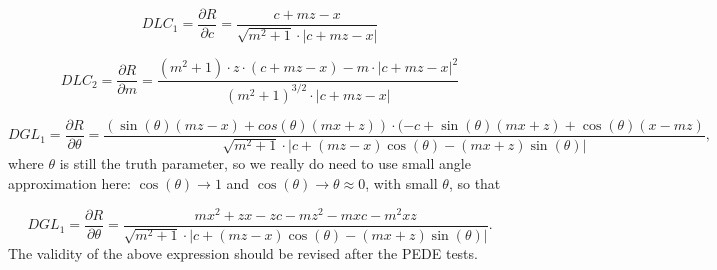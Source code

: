 \documentclass[a4paper,11pt]{article}
\begin{document}
\begin{equation}
DLC_1 = \frac{\partial R}{\partial c} = \frac{ c+mz-x }  { \sqrt{m^2+1} \cdot |c+mz-x| }
\end{equation}

\begin{equation}
DLC_2 = \frac{ \partial R}{\partial m} = \frac{ (m^2+1)\cdot z\cdot(c+mz-x) - m\cdot |c+mz-x|^2 }{ (m^2+1)^{3/2} \cdot |c+mz-x|  }
\end{equation}

\begin{equation}	
DGL_1 = \frac{\partial R}{\partial\theta} = \frac{(\sin(\theta)(mz-x)+cos(\theta)(mx+z)) \cdot (-c+\sin(\theta)(mx+z)+\cos(\theta)(x-mz)}{\sqrt{m^2+1} \cdot |c+(mz-x)\cos(\theta) - (mx+z)\sin(\theta)|},
\end{equation}
where $\theta$ is still the truth parameter, so we really do need to use small angle approximation here: $\cos(\theta) \rightarrow 1$ and $\cos(\theta) \rightarrow \theta \approx 0$, with small $\theta$, so that 

\begin{equation}	
DGL_1 = \frac{\partial R}{\partial\theta} = \frac{mx^2+zx-zc-mz^2-mxc-m^2xz}{\sqrt{m^2+1} \cdot |c+(mz-x)\cos(\theta) - (mx+z)\sin(\theta)|}.
\end{equation}
The validity of the above expression should be revised after the PEDE tests. 
\clearpage



\nocite{*}
\thispagestyle{plain}
%
\end{document}
